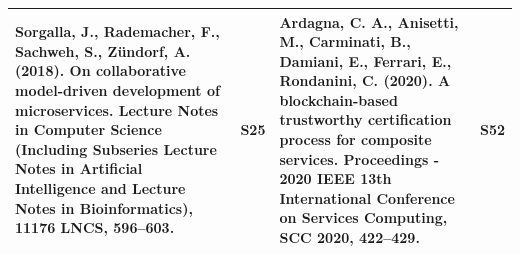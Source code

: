 \documentclass{article}
\begin{document}
\begin{appendices}
\begin{table}
\begin{center}
\begin{tabular}{ | m{20em} | m{1cm}| m{20em} | m{1cm} | }
Sorgalla, J., Rademacher, F., Sachweh, S.,  Zündorf, A. (2018). On collaborative model-driven development of microservices. Lecture Notes in Computer Science (Including Subseries Lecture Notes in Artificial Intelligence and Lecture Notes in Bioinformatics), 11176 LNCS, 596–603.                                                                    & S25            & Ardagna, C. A., Anisetti, M., Carminati, B., Damiani, E., Ferrari, E.,  Rondanini, C. (2020). A blockchain-based trustworthy certification process for composite services. Proceedings - 2020 IEEE 13th International Conference on Services Computing, SCC 2020, 422–429.                                                                                                                                                     & S52             \\ 
\hline
\end{tabular}
\end{center}
\end{table}

\newpage


\end{appendices}
\end{document}

